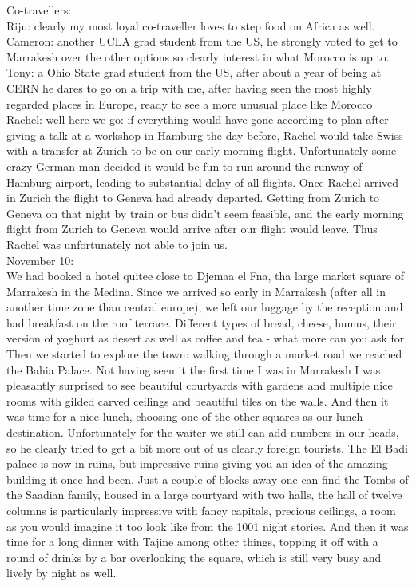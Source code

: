 Co-travellers:\\
Riju: clearly my most loyal co-traveller loves to step food on Africa as well.\\
Cameron: another UCLA grad student from the US, he strongly voted to get to Marrakesh over the other options so clearly interest in what Morocco is up to.\\
Tony: a Ohio State grad student from the US, after about a year of being at CERN he dares to go on a trip with me, after having seen the most highly regarded places in Europe, ready to see a more unusual place like Morocco\\
Rachel: well here we go: if everything would have gone according to plan after giving a talk at a workshop in Hamburg the day before, Rachel would take Swiss with a transfer at Zurich to be on our early morning flight. Unfortunately some crazy German man decided it would be fun to run around the runway of Hamburg airport, leading to substantial delay of all flights. Once Rachel arrived in Zurich the flight to Geneva had already departed. Getting from Zurich to Geneva on that night by train or bus didn't seem feasible, and the early morning flight from Zurich to Geneva would arrive after our flight would leave. Thus Rachel was unfortunately not able to join us.\\

November 10:\\
We had booked a hotel quitee close to Djemaa el Fna, tha large market square of Marrakesh in the Medina. Since we arrived so early in Marrakesh (after all in another time zone than central europe), we left our luggage by the reception and had breakfast on the roof terrace. Different types of bread, cheese, humus, their version of yoghurt as desert as well as coffee and tea - what more can you ask for. Then we started to explore the town: walking through a market road we reached the Bahia Palace. Not having seen it the first time I was in Marrakesh I was pleasantly surprised to see beautiful courtyards with gardens and multiple nice rooms with gilded carved ceilings and beautiful tiles on the walls. And then it was time for a nice lunch, choosing one of the other squares as our lunch destination. Unfortunately for the waiter we still can add numbers in our heads, so he clearly tried to get a bit more out of us clearly foreign tourists. The El Badi palace is now in ruins, but impressive ruins giving you an idea of the amazing building it once had been. Just a couple of blocks away one can find the Tombs of the Saadian family, housed in a large courtyard with two halls, the hall of twelve columns is particularly impressive with fancy capitals, precious ceilings, a room as you would imagine it too look like from the 1001 night stories. And then it was time for a long dinner with Tajine among other things, topping it off with a round of drinks by a bar overlooking the square, which is still very busy and lively by night as well.\\

